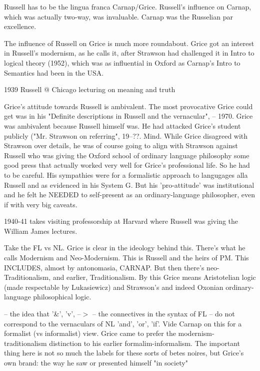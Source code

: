 \documentclass[10pt,titlepage]{book}
\begin{document}
Russell has to be the lingua franca Carnap/Grice.
Russell's influence on Carnap, which was actually two-way, was invaluable.
Carnap was the Russelian par excellence.

The influence of Russell on Grice is much more roundabout. 
Grice got  an interest in Russell's modernism, as he calls it, after 
Strawson had  challenged it in Intro to logical theory (1952), which was as 
influential in  Oxford as Carnap's Intro to Semantics had been in the USA.

1939 Russell @ Chicago lecturing on meaning and  truth  

Grice's attitude towards Russell is ambivalent.
The most provocative Grice could get was in his "Definite descriptions in Russell and the vernacular", -- 1970.
Grice was ambivalent because Russell himself was.
He had attacked Grice's student publicly ("Mr. Strawson on referring", 19--??. Mind.
While Grice disagreed with Strawson over details, he was of course going to align with Strawson against Russell who was giving the Oxford school of ordinary language philosophy some good press that actually worked very well for Grice's  professional life.
So he had to be careful.
His sympathies were for a formalistic approach to langugages alla Russell and as evidenced in his System G.
But his 'pro-attitude' was institutional and he felt he NEEDED to self-present as an ordinary-language philosopher, even if with very big caveats.
 
1940-41 takes visiting professorship at Harvard  where Russell was giving 
the William James lectures.  

Take the FL vs NL.
Grice is clear in the ideology behind this.
There's what he calls Modernism and Neo-Modernism.
This is Russell and the heirs of PM.
This INCLUDES, almost by antonomasia, CARNAP.
But then there's neo-Traditionalism, and earlier, Traditionalism.
By this Grice means Aristotelian logic (made respectable by Lukasiewicz) and Strawson's and indeed Oxonian ordinary-language philosophical logic. 

--  the idea that '\&', 'v', --$>$ -- the connectives in the syntax of FL -- 
do  not correspond to the vernaculars of NL 'and', 'or', 'if'. Vide Carnap on 
this  for a formalist (vs informalist) view. Grice came to prefer the  
modernism-traditionalism distinction to his earlier formalim-informalism. The  
important thing here is not so much the labels for these sorts of betes 
noires,  but Grice's own brand: the way he saw or presented himself "in society" 
\end{document}
